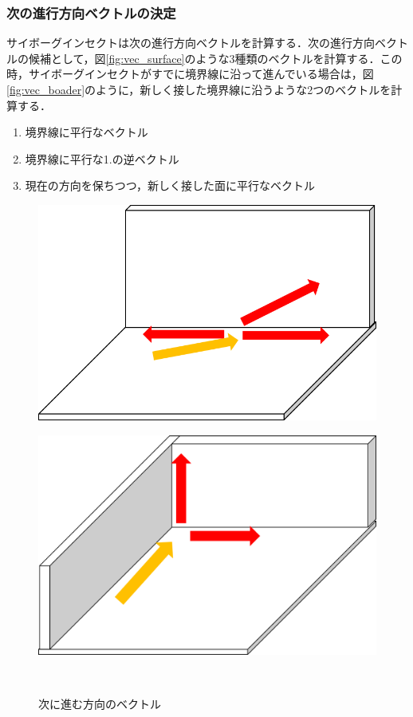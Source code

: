 \documentclass[a4paper,11pt]{jarticle}
\begin{document}
	\subsubsection{次の進行方向ベクトルの決定}
	\label{vector}
	サイボーグインセクトは次の進行方向ベクトルを計算する．次の進行方向ベクトルの候補として，図\ref{fig:vec_surface}のような3種類のベクトルを計算する．この時，サイボーグインセクトがすでに境界線に沿って進んでいる場合は，図\ref{fig:vec_boader}のように，新しく接した境界線に沿うような2つのベクトルを計算する．
	\begin{enumerate}
		\item 境界線に平行なベクトル
		\item 境界線に平行な1.の逆ベクトル
		\item 現在の方向を保ちつつ，新しく接した面に平行なベクトル
	\end{enumerate}
	\begin{figure}
		\begin{minipage}{0.5\linewidth}
			\centering
			\includegraphics[width=1\linewidth]{png/vector.png}
			\label{fig:vec_surface}
		\end{minipage}
		\begin{minipage}{0.5\linewidth}
			\centering
			\includegraphics[width=1\linewidth]{png/vector2.png}
			\label{fig:vec_boader}
		\end{minipage}\\
		\caption{次に進む方向のベクトル}
		\label{fig:vector}
	\end{figure}
	
\end{document}
